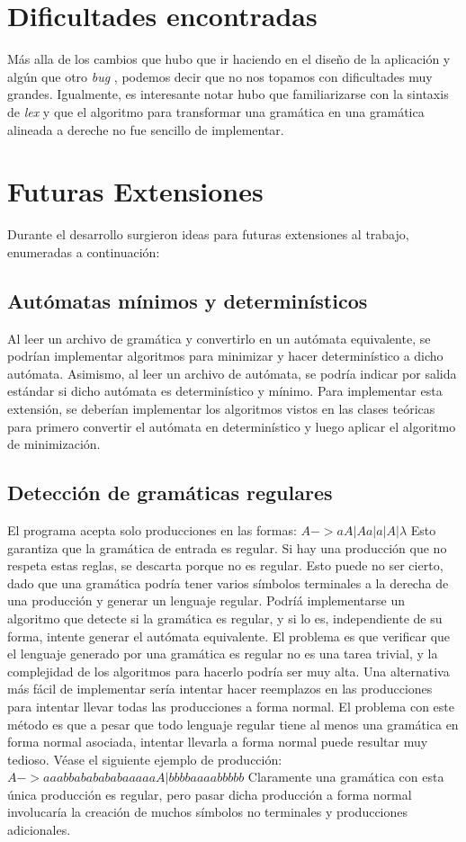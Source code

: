 \documentclass[a4paper,10pt]{article}
\begin{document}
\newpage

\section{Dificultades encontradas}
    Más alla de los cambios que hubo que ir haciendo en el diseño de la aplicación y algún que otro \textit{bug} 
    , podemos decir que no nos topamos con dificultades muy grandes. Igualmente, es interesante notar hubo que 
    familiarizarse con la sintaxis de \textit{lex} y que el algoritmo para transformar una gramática en una 
    gramática alineada a dereche no fue sencillo de implementar.
\newpage

\section{Futuras Extensiones}
    Durante el desarrollo surgieron ideas para futuras extensiones al trabajo, enumeradas a continuación:
\subsection{ Autómatas mínimos y determinísticos }
Al leer un archivo de gramática y convertirlo en un autómata equivalente, se podrían implementar algoritmos para minimizar y hacer
determinístico a dicho autómata. Asimismo, al leer un archivo de autómata, se podría indicar por salida estándar si dicho autómata es 
determinístico y mínimo. Para implementar esta extensión, se deberían implementar los algoritmos vistos en las clases teóricas para 
primero convertir el autómata en determinístico y luego aplicar el algoritmo de minimización.
\subsection{Detección de gramáticas regulares}
El programa acepta solo producciones en las formas:
$A->aA | Aa | a | A | \lambda$
Esto garantiza que la gramática de entrada es regular. Si hay una producción que no respeta estas reglas, se descarta porque no es regular. Esto 
puede no ser cierto, dado que una gramática podría tener varios símbolos terminales a la derecha de una producción y generar un lenguaje regular. 
Podríá implementarse un algoritmo que detecte si la gramática es regular, y si lo es, independiente de su forma, intente generar el autómata 
equivalente. El problema es que verificar que el lenguaje generado por una gramática es regular no es una tarea  trivial, y la complejidad de los algoritmos 
para hacerlo podría ser muy alta. Una alternativa más fácil de implementar sería intentar hacer reemplazos en las producciones para intentar llevar todas 
las producciones a forma normal. El problema con este método es que a pesar que todo lenguaje regular tiene al menos una gramática en forma normal 
asociada, intentar llevarla a forma normal puede resultar muy tedioso. Véase el siguiente ejemplo de producción:
$ A->aaabbababababaaaaaA | bbbbaaaabbbbb $
Claramente una gramática con esta única producción es regular, pero pasar dicha producción a forma normal involucaría la creación de muchos símbolos 
no terminales y producciones adicionales.
\end{document}
